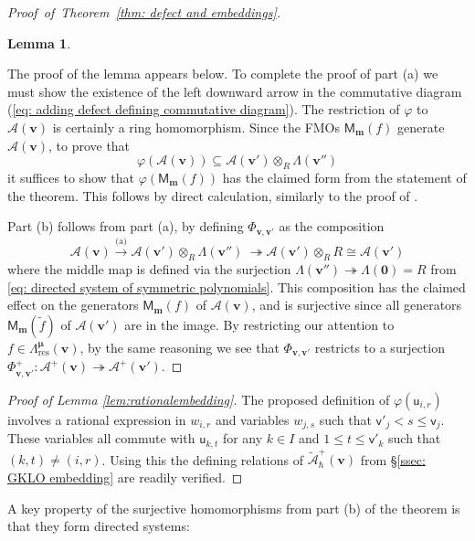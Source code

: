 \documentclass[11pt,reqno]{amsart}
\renewcommand{\mathbf}{\mathbold}
\numberwithin{equation}{section}
\newtheorem{Lemma}[equation]{Lemma}
\theoremstyle{definition}
\newcommand{\cA}{\mathcal{A}}
\newcommand{\bm}{\mathbf{m}}
\newcommand{\bv}{\mathbf{v}}
\renewcommand{\tilde}[1]{\widetilde{#1}}
\renewcommand{\bv}{\mathbf{v}} %
\newcommand{\sv}{\mathsf{v}}
\newcommand{\M}{\mathsf{M}}
\newcommand{\sfu}{\mathsf{u}}
\newcommand{\vertexset}{I}
\newcommand{\GT}{\Lambda}
\newcommand{\base}{R}
\newcommand{\bmu}{{\boldsymbol{\mu}}}
\newcommand{\qzast}{\cA}
\newcommand{\qzastplus}{\cA^{+}}
\newcommand{\res}{\mathrm{res}}
\begin{document}
\begin{proof}[\mbox{Proof of Theorem \ref{thm: defect and embeddings}}]
\begin{Lemma}
$$$$
\end{Lemma}
The proof of the lemma appears below.  To complete the proof of part (a) we must show the existence of the left downward arrow in the commutative diagram (\ref{eq: adding defect defining commutative diagram}).  The restriction of $\varphi$ to $\qzast(\bv)$ is certainly a ring homomorphism.  Since the FMOs $\M_\bm(f)$ generate $\qzast(\bv)$, to prove that 
$$
\varphi( \qzast(\bv)) \subseteq \qzast(\bv') \otimes_{\base} \GT(\bv'')
$$
it suffices to show that $\varphi(\M_\bm(f))$ has the claimed form from the statement of the theorem. This follows by direct calculation, similarly to the proof of \cite[Theorem 2.57]{MW2}.

Part (b) follows from part (a), by defining $\Phi_{\bv, \bv'}$ as the composition
$$
\qzast(\bv) \stackrel{\text{(a)}}{\longrightarrow} \qzast(\bv') \otimes_{\base} \GT(\bv'') \ \twoheadrightarrow \qzast(\bv') \otimes_\base \base \cong \qzast(\bv')
$$
where the middle map is defined via the surjection $\GT(\bv'') \twoheadrightarrow \GT(\mathbf 0) = \base$ from \eqref{eq: directed system of symmetric polynomials}.  This composition has the claimed effect on the generators $\M_\bm(f)$ of $\qzast(\bv)$, and is surjective since all generators $\M_\bm(\widetilde{f})$ of $\qzast(\bv')$ are in the image. By restricting our  attention to $f \in \GT^\bmu_\res(\bv)$, by the same reasoning we see that $\Phi_{\bv,\bv'}$  restricts to a surjection $\Phi_{\bv,\bv'}^+ : \qzastplus(\bv) \twoheadrightarrow \qzastplus(\bv')$.
\end{proof}

\begin{proof}[Proof of Lemma \ref{lem:rationalembedding}]
The proposed definition of $\varphi(\sfu_{i,r})$ involves a rational expression in $w_{i,r}$ and variables $w_{j,s}$ such that $\sv'_j < s \leq \sv_j$.  These variables all commute with $\sfu_{k,t}$ for any $k \in \vertexset$ and $1 \leq t \leq \sv'_k$ such that $(k,t) \neq (i,r)$. Using this the defining relations of $\tilde{\cA}_\hbar^+(\bv)$ from \S \ref{ssec: GKLO embedding} are readily verified. 
\end{proof}

A key property of the  surjective homomorphisms from part (b) of the theorem is that they form directed systems:
\end{document}
